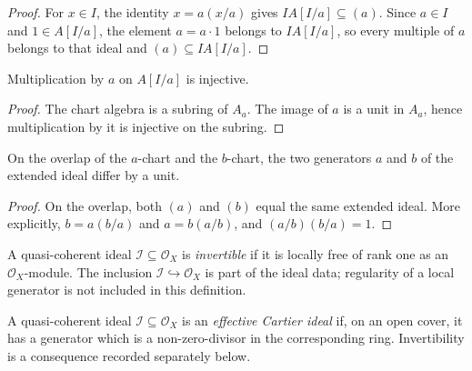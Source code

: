 \begin{proof}
  For $x\in I$, the identity $x=a(x/a)$ gives
  $IA[I/a]\subseteq(a)$.  Since $a\in I$ and $1\in A[I/a]$, the element
  $a=a\cdot1$ belongs to $IA[I/a]$, so every multiple of $a$ belongs to that
  ideal and $(a)\subseteq IA[I/a]$.
\end{proof}

\begin{lemma}
  \label{lemma:nagata-chart-generator-regular}

  Multiplication by $a$ on $A[I/a]$ is injective.
\end{lemma}

\begin{proof}
  The chart algebra is a subring of $A_a$.  The image of $a$ is a unit in
  $A_a$, hence multiplication by it is injective on the subring.
\end{proof}

\begin{lemma}
  \label{lemma:nagata-chart-generators-associated}

  On the overlap of the $a$-chart and the $b$-chart, the two generators $a$
  and $b$ of the extended ideal differ by a unit.
\end{lemma}

\begin{proof}
  On the overlap, both $(a)$ and $(b)$ equal the same extended ideal.  More
  explicitly, $b=a(b/a)$ and $a=b(a/b)$, and $(a/b)(b/a)=1$.
\end{proof}

\begin{definition}
  \label{def:nagata-invertible-ideal}

  A quasi-coherent ideal $\mathcal I\subseteq\mathcal O_X$ is
  \emph{invertible} if it is locally free of rank one as an
  $\mathcal O_X$-module.  The inclusion $\mathcal I\hookrightarrow\mathcal O_X$
  is part of the ideal data; regularity of a local generator is not included
  in this definition.
\end{definition}

\begin{definition}
  \label{def:nagata-effective-cartier-ideal}

  A quasi-coherent ideal $\mathcal I\subseteq\mathcal O_X$ is an
  \emph{effective Cartier ideal} if, on an open cover, it has a generator
  which is a non-zero-divisor in the corresponding ring.  Invertibility is
  a consequence recorded separately below.
\end{definition}

